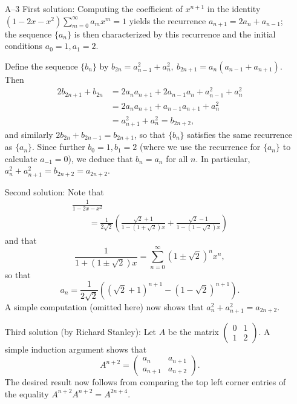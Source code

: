 \documentclass[amssymb,twocolumn,pra,10pt,aps]{revtex4-1}
\begin{document}
\begin{itemize}
\item[A--3]
First solution:
Computing the coefficient of $x^{n+1}$ in the identity
$(1-2x-x^2)\sum_{m=0}^\infty a_m x^m = 1$ yields the recurrence
$a_{n+1} = 2a_n + a_{n-1}$; the sequence $\{a_n\}$ is then characterized
by this recurrence and the initial conditions $a_0 = 1, a_1 = 2$.

Define the sequence $\{b_n\}$ by
$b_{2n} = a_{n-1}^2 + a_n^2,~b_{2n+1} = a_n(a_{n-1}+a_{n+1}).$
Then
\begin{align*}
2b_{2n+1}+b_{2n} &= 2a_na_{n+1}+2a_{n-1}a_n+a_{n-1}^2+a_n^2 \\
&= 2a_na_{n+1} + a_{n-1}a_{n+1} + a_n^2 \\
&= a_{n+1}^2 + a_n^2 = b_{2n+2},
\end{align*}
and similarly $2b_{2n}+b_{2n-1} = b_{2n+1}$, so that $\{b_n\}$ satisfies
the same recurrence as $\{a_n\}$.  Since further $b_0=1,b_1=2$ (where
we use the recurrence for $\{a_n\}$ to calculate $a_{-1}=0$),
we deduce that $b_n=a_n$ for all $n$.  In particular,
$a_n^2+a_{n+1}^2 = b_{2n+2} = a_{2n+2}$.

Second solution:
Note that
\begin{multline*}
\frac{1}{1-2x-x^2} \\
\qquad = \frac{1}{2\sqrt{2}} \left(
\frac{\sqrt{2}+1}{1-(1+\sqrt{2})x} + \frac{\sqrt{2}-1}{1-(1-\sqrt{2})x}
\right)
\end{multline*}
and that
\[
\frac{1}{1 + (1\pm\sqrt{2})x} = \sum_{n=0}^\infty (1\pm\sqrt{2})^n x^n,
\]
so that
\[
a_n = \frac{1}{2\sqrt{2}} \left((\sqrt{2}+1)^{n+1} - (1-\sqrt{2})^{n+1}
\right).
\]
A simple computation (omitted here) now shows that
$a_n^2 + a_{n+1}^2 = a_{2n+2}$.

Third solution (by Richard Stanley):
Let $A$ be the matrix $\begin{pmatrix} 0 & 1 \\1 & 2 \end{pmatrix}$.
A simple induction argument shows that
\[
A^{n+2} = \begin{pmatrix} a_n & a_{n+1} \\ a_{n+1} & a_{n+2}
\end{pmatrix}.
\]
The desired result now follows from comparing the top left corner
entries of the equality $A^{n+2} A^{n+2} = A^{2n+4}$.


\end{itemize}
\end{document}

